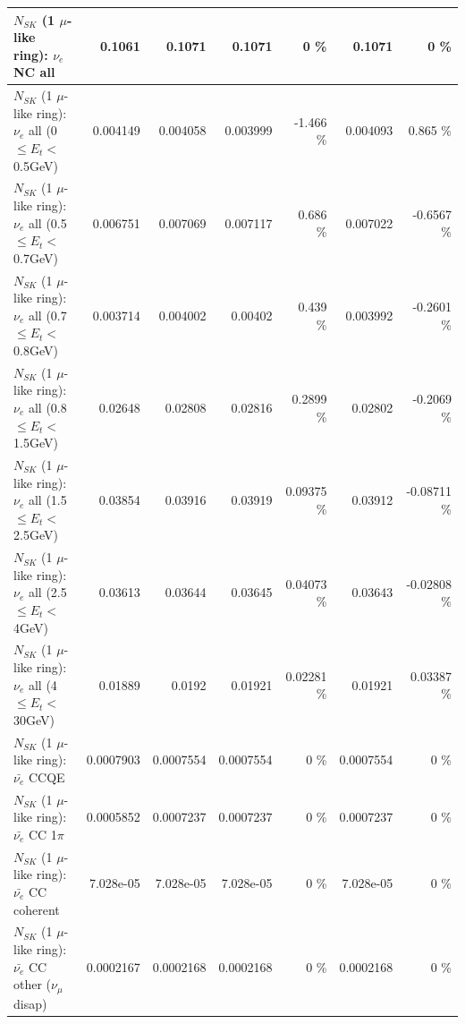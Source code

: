 \begin{table}
\begin{tabular}{| l | r | r | r  r | r  r |}
                                  $N_{SK}$ (1 $\mu$-like ring): $\nu_{e}$ NC all &          0.1061 &          0.1071 &          0.1071 &        0 \%  &          0.1071 &        0 \%  \\ 
\hline
           $N_{SK}$ (1 $\mu$-like ring): $\nu_{e}$ all (0 $\leq E_{t} <$ 0.5GeV) &        0.004149 &        0.004058 &        0.003999 &   -1.466 \%  &        0.004093 &    0.865 \%  \\ 
         $N_{SK}$ (1 $\mu$-like ring): $\nu_{e}$ all (0.5 $\leq E_{t} <$ 0.7GeV) &        0.006751 &        0.007069 &        0.007117 &    0.686 \%  &        0.007022 &  -0.6567 \%  \\ 
         $N_{SK}$ (1 $\mu$-like ring): $\nu_{e}$ all (0.7 $\leq E_{t} <$ 0.8GeV) &        0.003714 &        0.004002 &         0.00402 &    0.439 \%  &        0.003992 &  -0.2601 \%  \\ 
         $N_{SK}$ (1 $\mu$-like ring): $\nu_{e}$ all (0.8 $\leq E_{t} <$ 1.5GeV) &         0.02648 &         0.02808 &         0.02816 &   0.2899 \%  &         0.02802 &  -0.2069 \%  \\ 
         $N_{SK}$ (1 $\mu$-like ring): $\nu_{e}$ all (1.5 $\leq E_{t} <$ 2.5GeV) &         0.03854 &         0.03916 &         0.03919 &  0.09375 \%  &         0.03912 & -0.08711 \%  \\ 
           $N_{SK}$ (1 $\mu$-like ring): $\nu_{e}$ all (2.5 $\leq E_{t} <$ 4GeV) &         0.03613 &         0.03644 &         0.03645 &  0.04073 \%  &         0.03643 & -0.02808 \%  \\ 
            $N_{SK}$ (1 $\mu$-like ring): $\nu_{e}$ all (4 $\leq E_{t} <$ 30GeV) &         0.01889 &          0.0192 &         0.01921 &  0.02281 \%  &         0.01921 &  0.03387 \%  \\ 
\hline
\hline
\hline
                                $N_{SK}$ (1 $\mu$-like ring): $\bar{\nu_e}$ CCQE &       0.0007903 &       0.0007554 &       0.0007554 &        0 \%  &       0.0007554 &        0 \%  \\ 
                           $N_{SK}$ (1 $\mu$-like ring): $\bar{\nu_e}$ CC 1$\pi$ &       0.0005852 &       0.0007237 &       0.0007237 &        0 \%  &       0.0007237 &        0 \%  \\ 
                         $N_{SK}$ (1 $\mu$-like ring): $\bar{\nu_e}$ CC coherent &       7.028e-05 &       7.028e-05 &       7.028e-05 &        0 \%  &       7.028e-05 &        0 \%  \\ 
          $N_{SK}$ (1 $\mu$-like ring): $\bar{\nu_e}$ CC other ($\nu_\mu$ disap) &       0.0002167 &       0.0002168 &       0.0002168 &        0 \%  &       0.0002168 &        0 \%  \\ 

\end{tabular}
\end{table}
